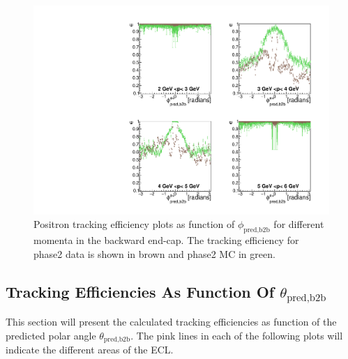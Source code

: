 \documentclass[a4paper,11pt,twosided,final,german,openbib,pdftex,listof=totoc,bibliography=totoc]{scrbook}
\begin{document}
\begin{figure}[!htbp]
	\centering
	\includegraphics[width=\textwidth]{Plots/master/xPMPhiepEC}
	\caption[Momentum $\phi_{\textrm{pred,b2b}}$ Positron Backward End-Cap Efficiency Phase2]{Positron tracking efficiency plots as function of  $\phi_{\textrm{pred,b2b}}$ for different momenta in the backward end-cap. The tracking efficiency for phase2 data is shown in brown and phase2 MC in green.}
	
	\label{plt:xPMPhiepEC}
\end{figure}

\clearpage


\subsection{Tracking Efficiencies As Function Of $\theta_{\textrm{pred,b2b}}$}

This section will present the calculated tracking efficiencies as function of the predicted polar angle $\theta_{\textrm{pred,b2b}}$. The pink lines in each of the following plots will indicate the different areas of the ECL.
\end{document}
